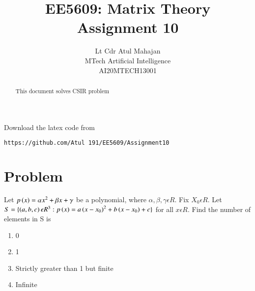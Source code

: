 \documentclass[journal,12pt,twocolumn]{IEEEtran}
\begin{document}
\def\putbox#1#2#3{\makebox[0in][l]{\makebox[#1][l]{}\raisebox{\baselineskip}[0in][0in]{\raisebox{#2}[0in][0in]{#3}}}}
     \def\rightbox#1{\makebox[0in][r]{#1}}
     \def\centbox#1{\makebox[0in]{#1}}
     \def\topbox#1{\raisebox{-\baselineskip}[0in][0in]{#1}}
     \def\midbox#1{\raisebox{-0.5\baselineskip}[0in][0in]{#1}}
\vspace{3cm}
\title{EE5609: Matrix Theory\\
          Assignment 10\\}
\author{Lt Cdr Atul Mahajan\\MTech Artificial Intelligence\\AI20MTECH13001 }
\maketitle
\newpage
\bigskip
\renewcommand{\thefigure}{\theenumi}
\renewcommand{\thetable}{\theenumi}
\begin{abstract}
This  document solves CSIR problem
\end{abstract}
Download the latex code from 
%
%
%
\begin{lstlisting}
https://github.com/Atul 191/EE5609/Assignment10
\end{lstlisting}
%
\section{\textbf{Problem}}
Let $p \left(x\right)= \alpha x^2+\beta x + \gamma$ be a polynomial, where $\alpha,\beta,\gamma \epsilon R$. Fix $X_0 \epsilon R$. Let $S=\{\left(a,b,c\right)  \epsilon R^3: p \left(x\right)= a \left(x-x_0\right)^2+b \left(x-x_0\right)+ c\}$ for all $x\epsilon R$. Find the number of elements in S is
\begin{enumerate}
    \item 0
    \item 1
    \item Strictly greater than 1 but finite
    \item Infinite
\end{enumerate}
\end{document}
